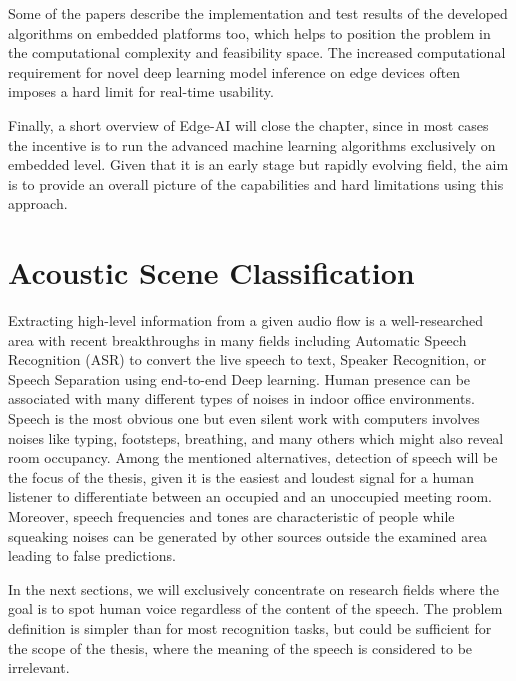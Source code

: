 Some of the papers describe the implementation and test results of the developed algorithms on embedded platforms too, which helps to position the problem in the computational complexity and feasibility space. The increased computational requirement for novel deep learning model inference on edge devices often imposes a hard limit for real-time usability.


Finally, a short overview of Edge-AI will close the chapter, since in most cases the incentive is to run the advanced machine learning algorithms exclusively on embedded level. Given that it is an early stage but rapidly evolving field, the aim is to provide an overall picture of the capabilities and hard limitations using this approach.




\section{Acoustic Scene Classification}

Extracting high-level information from a given audio flow is a well-researched area with recent breakthroughs in many fields including Automatic Speech Recognition (ASR) to convert the live speech to text, Speaker Recognition, or Speech Separation using end-to-end Deep learning. Human presence can be associated with many different types of noises in indoor office environments. Speech is the most obvious one but even silent work with computers involves noises like typing, footsteps, breathing, and many others which might also reveal room occupancy. Among the mentioned alternatives, detection of speech will be the focus of the thesis, given it is the easiest and loudest signal for a human listener to differentiate between an occupied and an unoccupied meeting room. Moreover, speech frequencies and tones are characteristic of people while squeaking noises can be generated by other sources outside the examined area leading to false predictions.

In the next sections, we will exclusively concentrate on research fields where the goal is to spot human voice regardless of the content of the speech. The problem definition is simpler than for most recognition tasks, but could be sufficient for the scope of the thesis, where the meaning of the speech is considered to be irrelevant.


